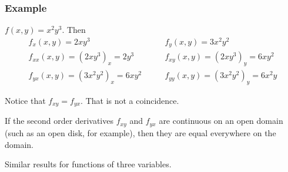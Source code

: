 \begin{frame}
  \frametitle{Example}

  $f(x,y) = x^2y^3$. Then\pause
%
\begin{align*}
  f_x(x,y) = 2xy^3 \quad & \quad f_{y}(x,y) = 3x^2y^2 \\
  f_{xx}(x,y) = (2xy^3)_x = 2y^3 \quad & \quad f_{xy}(x,y) = (2xy^3)_y = 6xy^2 \\
  f_{yx}(x,y) = (3x^2y^2)_x = 6xy^2 \quad & \quad f_{yy}(x,y) = (3x^2y^2)_y = 6x^2y
\end{align*}

\pause Notice that $f_{xy} = f_{yx}$. That is not a coincidence.

\begin{theorem}[Clairaut] If the second order derivatives $f_{xy}$ and $f_{yx}$ are continuous on an open domain (such as an open disk, for example), then they are equal everywhere on the domain.
\end{theorem}

Similar results for functions of three variables.
\end{frame}